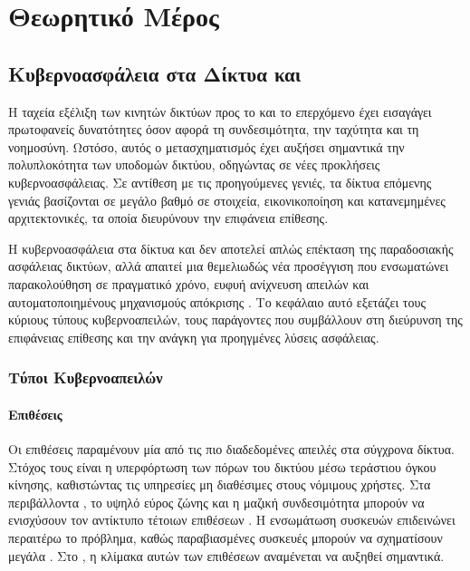 \chapter{Θεωρητικό Μέρος}

\section{Κυβερνοασφάλεια στα Δίκτυα  και }


Η ταχεία εξέλιξη των κινητών δικτύων προς το  και το επερχόμενο  έχει εισαγάγει πρωτοφανείς δυνατότητες όσον αφορά τη συνδεσιμότητα,
την ταχύτητα και τη νοημοσύνη. Ωστόσο, αυτός ο μετασχηματισμός έχει αυξήσει σημαντικά την πολυπλοκότητα των υποδομών δικτύου, 
οδηγώντας σε νέες προκλήσεις κυβερνοασφάλειας. Σε αντίθεση με τις προηγούμενες γενιές, τα δίκτυα επόμενης γενιάς βασίζονται σε μεγάλο βαθμό
 σε  στοιχεία, εικονικοποίηση και κατανεμημένες αρχιτεκτονικές, τα οποία διευρύνουν την επιφάνεια επίθεσης.

Η κυβερνοασφάλεια στα δίκτυα  και  δεν αποτελεί απλώς επέκταση της παραδοσιακής ασφάλειας δικτύων, αλλά απαιτεί μια θεμελιωδώς νέα προσέγγιση 
που ενσωματώνει παρακολούθηση σε πραγματικό χρόνο, ευφυή ανίχνευση απειλών και αυτοματοποιημένους μηχανισμούς απόκρισης \cite{ferrag2019security}. 
Το κεφάλαιο αυτό εξετάζει τους κύριους τύπους κυβερνοαπειλών, τους παράγοντες που συμβάλλουν στη διεύρυνση της επιφάνειας επίθεσης και την ανάγκη για προηγμένες 
λύσεις ασφάλειας.

\subsection{Τύποι Κυβερνοαπειλών}

\subsubsection{Επιθέσεις }

Οι επιθέσεις  παραμένουν μία από τις πιο διαδεδομένες απειλές στα σύγχρονα δίκτυα. Στόχος τους είναι η υπερφόρτωση των πόρων του δικτύου μέσω τεράστιου όγκου κίνησης, καθιστώντας τις υπηρεσίες μη διαθέσιμες στους νόμιμους χρήστες. Στα περιβάλλοντα , το υψηλό εύρος ζώνης και η μαζική συνδεσιμότητα μπορούν να ενισχύσουν τον αντίκτυπο τέτοιων επιθέσεων \cite{zhang2019ddos}. Η ενσωμάτωση συσκευών  επιδεινώνει περαιτέρω το πρόβλημα, καθώς παραβιασμένες συσκευές μπορούν να σχηματίσουν μεγάλα . Στο , η κλίμακα αυτών των επιθέσεων αναμένεται να αυξηθεί σημαντικά.

